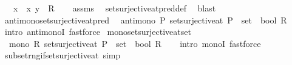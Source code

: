 \begin{isabellebody}
\ \ \ x\ \ {\isachardoublequoteopen}{\isasymlangle}x{\isacharcomma}{\kern0pt}\ y{\isasymrangle}\ {\isasymin}\ R{\isachardoublequoteclose}\isanewline
%
\isadelimproof
\ \ %
\endisadelimproof
%
\isatagproof
{}\isamarkupfalse%
\ assms\ \isamarkupfalse%
\ set{\isacharunderscore}{\kern0pt}surjective{\isacharunderscore}{\kern0pt}at{\isacharunderscore}{\kern0pt}pred{\isacharunderscore}{\kern0pt}def\ \isamarkupfalse%
\ blast%
\endisatagproof
{\isafoldproof}%
%
\isadelimproof
\isanewline
%
\endisadelimproof
\isanewline
{}\isamarkupfalse%
\ antimono{\isacharunderscore}{\kern0pt}set{\isacharunderscore}{\kern0pt}surjective{\isacharunderscore}{\kern0pt}at{\isacharunderscore}{\kern0pt}pred{\isacharcolon}{\kern0pt}\isanewline
\ \ {\isachardoublequoteopen}antimono\ {\isacharparenleft}{\kern0pt}{\isasymlambda}P{\isachardot}{\kern0pt}\ set{\isacharunderscore}{\kern0pt}surjective{\isacharunderscore}{\kern0pt}at\ {\isacharparenleft}{\kern0pt}P\ {\isacharcolon}{\kern0pt}{\isacharcolon}{\kern0pt}\ set\ {\isasymRightarrow}\ bool{\isacharparenright}{\kern0pt}\ R{\isacharparenright}{\kern0pt}{\isachardoublequoteclose}\isanewline
%
\isadelimproof
\ \ %
\endisadelimproof
%
\isatagproof
{}\isamarkupfalse%
\ {\isacharparenleft}{\kern0pt}intro\ antimonoI{\isacharparenright}{\kern0pt}\ fastforce%
\endisatagproof
{\isafoldproof}%
%
\isadelimproof
\isanewline
%
\endisadelimproof
\isanewline
{}\isamarkupfalse%
\ mono{\isacharunderscore}{\kern0pt}set{\isacharunderscore}{\kern0pt}surjective{\isacharunderscore}{\kern0pt}at{\isacharunderscore}{\kern0pt}set{\isacharcolon}{\kern0pt}\isanewline
\ \ {\isachardoublequoteopen}mono\ {\isacharparenleft}{\kern0pt}{\isasymlambda}R{\isachardot}{\kern0pt}\ set{\isacharunderscore}{\kern0pt}surjective{\isacharunderscore}{\kern0pt}at\ {\isacharparenleft}{\kern0pt}P\ {\isacharcolon}{\kern0pt}{\isacharcolon}{\kern0pt}\ set\ {\isasymRightarrow}\ bool{\isacharparenright}{\kern0pt}\ R{\isacharparenright}{\kern0pt}{\isachardoublequoteclose}\isanewline
%
\isadelimproof
\ \ %
\endisadelimproof
%
\isatagproof
{}\isamarkupfalse%
\ {\isacharparenleft}{\kern0pt}intro\ monoI{\isacharparenright}{\kern0pt}\ fastforce%
\endisatagproof
{\isafoldproof}%
%
\isadelimproof
\isanewline
%
\endisadelimproof
\isanewline
{}\isamarkupfalse%
\ subset{\isacharunderscore}{\kern0pt}rng{\isacharunderscore}{\kern0pt}if{\isacharunderscore}{\kern0pt}set{\isacharunderscore}{\kern0pt}surjective{\isacharunderscore}{\kern0pt}at\ {\isacharbrackleft}{\kern0pt}simp{\isacharbrackright}{\kern0pt}{\isacharcolon}{\kern0pt}\isanewline

\end{isabellebody}
